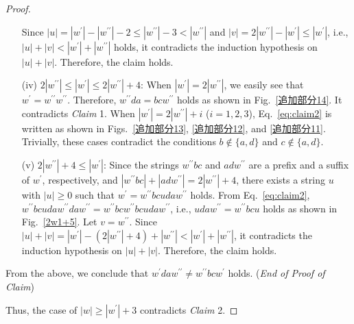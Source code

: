 \begin{proof}
\begin{enumerate}
  Since $|u| = |w^{\prime}| - |w^{\prime\prime}| - 2 \leq |w^{\prime\prime}| - 3 < |w^{\prime\prime}|$ and $|v| = 2|w^{\prime\prime}| - |w^{\prime}| \le |w^{\prime}|$, i.e., $|u| + |v| < |w^{\prime}| + |w^{\prime\prime}|$ holds, it contradicts the induction hypothesis on $|u| + |v|$. Therefore, the claim holds.
  \item[(iv)] $2|w^{\prime\prime}| \le |w^{\prime}| \le 2|w^{\prime\prime}|+4$:
  When $|w^{\prime}|=2|w^{\prime\prime}|$, we easily see that $w^{\prime} = w^{\prime\prime}w^{\prime\prime}$.
  Therefore, $w^{\prime\prime}da = bcw^{\prime\prime}$ holds as shown in Fig.~\ref{追加部分14}. It contradicts \textit{Claim} 1.
  When $|w^{\prime}|=2|w^{\prime\prime}|+i$ ($i=1,2,3$), Eq.~\ref{eq:claim2} is written as shown in Figs.~\ref{追加部分13}, \ref{追加部分12}, and \ref{追加部分11}. Trivially, these cases contradict the conditions $b \not\in \{a,d\}$ and $c \not\in \{a,d\}$.
  \item[(v)] $2|w^{\prime\prime}|+4 \leq |w^{\prime}|$:
  Since the strings $w^{\prime\prime}bc$ and $adw^{\prime\prime}$ are a prefix and a suffix of $w^{\prime}$, respectively, and $|w^{\prime\prime}bc| + |adw^{\prime\prime}| = 2|w^{\prime\prime}| + 4$, there exists a string $u$ with $|u| \geq 0$ such that $w^{\prime} = w^{\prime\prime}bcudaw^{\prime\prime}$ holds. From Eq.~\ref{eq:claim2}, $w^{\prime\prime}bcudaw^{\prime\prime}daw^{\prime\prime} = w^{\prime\prime}bcw^{\prime\prime}bcudaw^{\prime\prime}$, i.e., $udaw^{\prime\prime} = w^{\prime\prime}bcu$ holds as shown in Fig.~\ref{2w1+5}.
  Let $v = w^{\prime\prime}$.
  Since $|u| + |v| = |w^{\prime}|- (2|w^{\prime\prime}| + 4) + |w^{\prime\prime}| < |w^{\prime}| + |w^{\prime\prime}|$, it contradicts the induction hypothesis on $|u| + |v|$. Therefore, the claim holds.
  \end{enumerate}
  From the above, we conclude that $w^{\prime}daw^{\prime\prime} \not = w^{\prime\prime}bcw^{\prime}$ holds.
  (\textit{End of Proof of Claim})

\smallskip

\noindent
Thus, the case of $|w| \geq |w^{\prime}| + 3$ contradicts \textit{Claim} 2. 


\end{proof}
